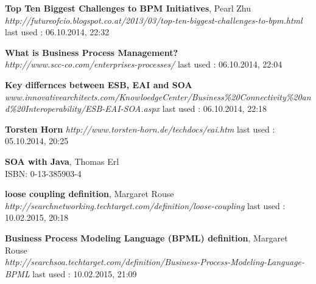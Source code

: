 \documentclass[12pt]{article}
\begin{document}
\begin{thebibliography}{56}
   \textbf{Top Ten Biggest Challenges to BPM Initiatives}, Pearl Zhu\\
  \emph{http://futureofcio.blogspot.co.at/2013/03/top-ten-biggest-challenges-to-bpm.html}
  \newline last used : 06.10.2014, 22:32
  
   \textbf{What is Business Process Management? }\\
  \emph{http://www.scc-co.com/enterprises-processes/}
  \newline last used : 06.10.2014, 22:04


   \textbf{Key differnces between ESB, EAI and SOA}\\
  \emph{www.innovativearchitects.com/KnowloedgeCenter/Business\%20Connectivity\%20and\%20Interoperability/ESB-EAI-SOA.aspx}
  \newline last used : 06.10.2014, 22:18


   \textbf{Torsten Horn}\newline
  \emph{http://www.torsten-horn.de/techdocs/eai.htm}
  \newline last used : 05.10.2014, 20:25


   \textbf{SOA with Java}, Thomas Erl \\
 	 ISBN: 0-13-385903-4
 	 
 	 
   \textbf{loose coupling definition}, Margaret Rouse\\
  \emph{ 	 http://searchnetworking.techtarget.com/definition/loose-coupling}
  \newline last used : 10.02.2015, 20:18
   	 
   	  
   \textbf{Business Process Modeling Language (BPML) definition}, Margaret Rouse\\
  \emph{http://searchsoa.techtarget.com/definition/Business-Process-Modeling-Language-BPML}
  \newline last used : 10.02.2015, 21:09
   	 
 	 
\end{thebibliography}
\end{document}
